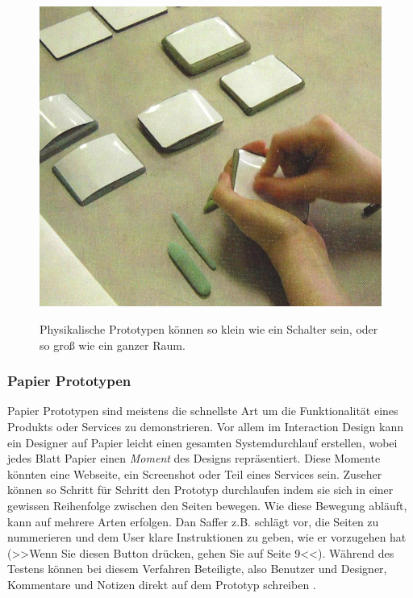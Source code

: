 \begin{figure}
	\begin{center}
        {\includegraphics[width=.8\linewidth]{gfx/safferPhysicalPrototype}}
	\end{center}
		\caption[Physikalische Prototypen. \newline \citep{Saffer:2007}]{Physikalische Prototypen können so klein wie ein Schalter sein, oder so groß wie ein ganzer Raum.}\label{fig:safferPhysicalPrototype}
\end{figure}

\subsubsection{Papier Prototypen} 
Papier Prototypen sind meistens die schnellste Art um die Funktionalität eines Produkts oder Services zu demonstrieren. Vor allem im Interaction Design kann ein Designer auf Papier leicht einen gesamten Systemdurchlauf erstellen, wobei jedes Blatt Papier einen \emph{Moment} des Designs repräsentiert. Diese Momente könnten eine Webseite, ein Screenshot oder Teil eines Services sein. Zuseher können so Schritt für Schritt den Prototyp durchlaufen indem sie sich in einer gewissen Reihenfolge zwischen den Seiten bewegen.
Wie diese Bewegung abläuft, kann auf mehrere Arten erfolgen. Dan Saffer z.B. schlägt vor, die Seiten zu nummerieren und dem User klare Instruktionen zu geben, wie er vorzugehen hat (>>Wenn Sie diesen Button drücken, gehen Sie auf Seite 9<<). Während des Testens können bei diesem Verfahren Beteiligte, also Benutzer und Designer, Kommentare und Notizen direkt auf dem Prototyp schreiben \citep{Saffer:2007}.

